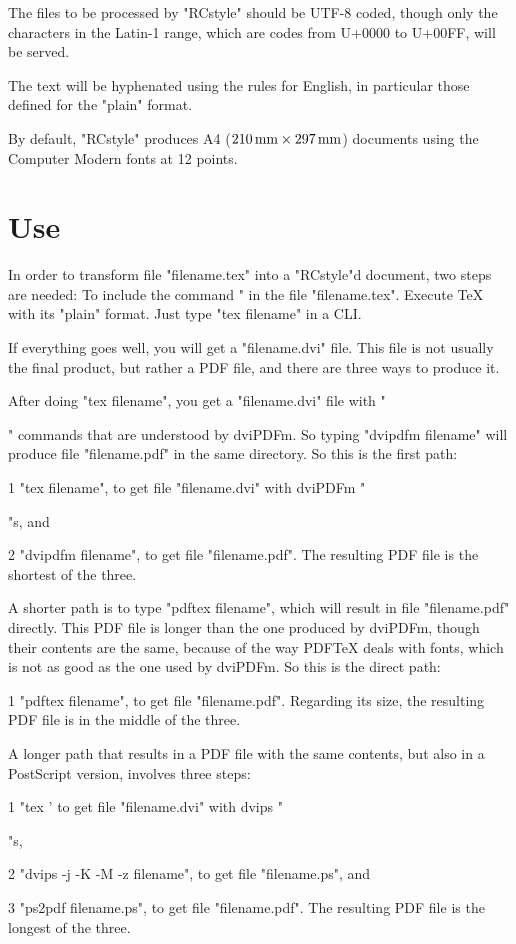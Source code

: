 The files to be processed by "RCstyle" should be
UTF-8 coded, though only the characters in the Latin-1 range,
which are codes from U+0000 to U+00FF,
will be served.

The text will be hyphenated using the rules for English,
in particular those defined for the "plain" format.

By default, "RCstyle" produces
 A4 ($210\,\hbox{mm}\times297\,\hbox{mm}$) documents
using the Computer Modern fonts at 12 points.


\section{Use}

In order to transform file "filename.tex"
into a "RCstyle"d document,
two steps are needed:
\beginpoints
\point To include the command "
       in the file "filename.tex".
\point Execute {\TeX} with its "plain" format.
       Just type "tex filename" in a CLI.
\endpoints

If everything goes well, you will get a "filename.dvi" file.
This file is not usually the final product,
but rather a PDF file, and there are three ways to produce it.

After doing "tex filename", you get a "filename.dvi" file
with "\special" commands that are understood by dviPDFm.
So typing "dvipdfm filename" will produce file
"filename.pdf" in the same directory.
So this is the first path:
\beginpoints
\item{1} "tex filename",
 to get file "filename.dvi" with dviPDFm "\special"s, and
\item{2} "dvipdfm filename",
 to get file "filename.pdf".
\endpoints
The resulting PDF file is the shortest of the three.

A shorter path is to type "pdftex filename",
which will result in file "filename.pdf" directly.
This PDF file is longer than the one produced by dviPDFm,
though their contents are the same,
because of the way PDF{\TeX} deals with fonts,
which is not as good as the one used by dviPDFm.
So this is the direct path:
\beginpoints
\item{1} "pdftex filename",
 to get file "filename.pdf".
\endpoints
Regarding its size,
the resulting PDF file is in the middle of the three.

A longer path that results in a PDF file with the same
contents, but also in a PostScript version, involves three steps:
\beginpoints
\item{1} "tex '\let\dvips\relax 
 to get file "filename.dvi" with dvips "\special"s,
\item{2} "dvips -j -K -M -z filename",
 to get file "filename.ps", and
\item{3} "ps2pdf filename.ps",
 to get file "filename.pdf".
\endpoints
The resulting PDF file is the longest of the three.



